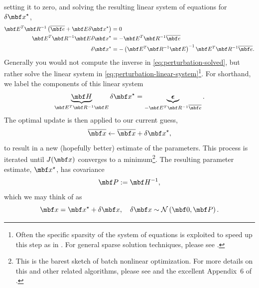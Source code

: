 \documentclass[11pt,a4,oneside]{article}
\begin{document}
setting it to zero, and solving the resulting linear system of equations for $\mbfDel x^\star$,
\begin{subequations}
  \begin{flalign}
  \mbf E^T \mbf R^{-1}\left(\mbfbar e + \mbf E \mbfDel x^\star \right) &= 0 \\
  \mbf E^T \mbf R^{-1} \mbf E \mbfDel x^\star &= -\mbf E^T \mbf R^{-1}\mbfbar e \label{eq:perturbation-linear-system}\\
  \mbfDel x^\star &= -\left(\mbf E^T \mbf R^{-1} \mbf E\right)^{-1} \mbf E^T \mbf R^{-1}\mbfbar e \label{eq:perturbation-solved}.
  \end{flalign}
\end{subequations}
Generally you would not compute the inverse in \eqref{eq:perturbation-solved}, but rather solve the linear system in \eqref{eq:perturbation-linear-system}\footnote{Often the specific sparsity of the system of equations is exploited to speed up this step as in \citet[Appendix~6]{Hartley0001}. For general sparse solution techniques, please see \citet{Davis0600}.}. For shorthand, we label the components of this linear system
\begin{equation}
  \label{eq:linear-system}
  \underbrace{\mbf H}_{ \mbf E^T \mbf R^{-1} \mbf E}  \mbfDel x^\star = \underbrace{ \mbs \epsilon }_{-\mbf E^T \mbf R^{-1}\mbfbar e} .
\end{equation}
The optimal update is then applied to our current guess,
\begin{equation}
  \label{eq:apply-update}
  \mbfbar x \leftarrow \mbfbar x + \mbfDel x^\star,
\end{equation}
to result in a new (hopefully better) estimate of the parameters. This process is iterated until $J(\mbf x)$ converges to a minimum\footnote{This is the barest sketch of batch nonlinear optimization. For more details on this and other related algorithms, please see \citet{nocedal06} and the excellent Appendix~6 of \citet{Hartley0001}.}.
The resulting parameter estimate, $\mbf x^\star$, has covariance \citep{Bell9300}
\begin{equation}
  \label{eq:cov-ml}
  \mbf P := \mbf H^{-1},
\end{equation}
which we may think of as
\begin{equation}
  \label{eq:cov-ml-del}
  \mbf x = \mbf x^\star + \mbfDel x, \quad \mbfDel x \sim \mathcal{N}\left(\mbf 0, \mbf P \right). 
\end{equation}
\end{document}
